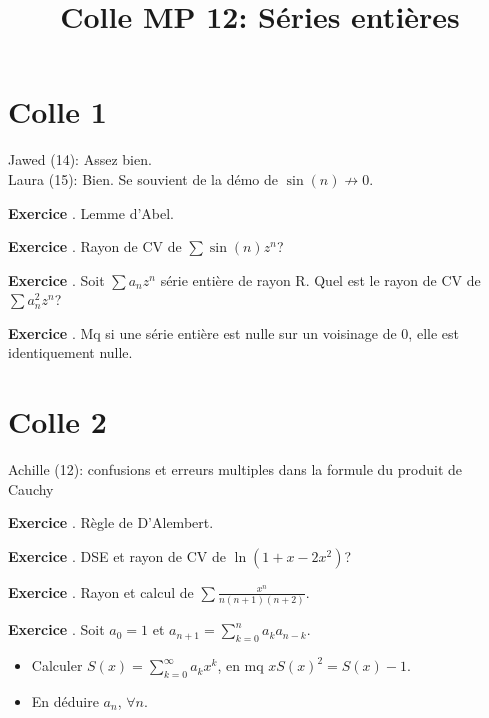\documentclass[10pt,a4paper]{article}
\title{Colle MP 12: Séries entières}
\newcounter{question}
\newcounter{exo}
\newenvironment{exo}{\vspace{0.5cm}\setcounter{question}{0}\addtocounter{exo}{1} \noindent \textbf{Exercice \theexo}. \normalsize }{\par}
\begin{document}
	\maketitle
	
	\section*{Colle 1}
	Jawed (14): Assez bien.\\
	Laura (15): Bien. Se souvient de la démo de $\sin(n) \not\longrightarrow 0$.\\
		
	\begin{exo}
		Lemme d'Abel.
	\end{exo}


	\begin{exo}
		Rayon de CV de $\sum \sin(n)z^n$?
	\end{exo}
	\begin{exo}
		Soit $\sum a_n z^n$ série entière de rayon R. Quel est le rayon de CV de $\sum a_n^2 z^n$?
	\end{exo}
			
	\begin{exo}
		Mq si une série entière est nulle sur un voisinage de 0, elle est identiquement nulle.
	\end{exo}
	\section*{Colle 2}
	\setcounter{exo}{0}
	Achille (12): confusions et erreurs multiples dans la formule du produit de Cauchy\\
	
	\begin{exo}
		Règle de D'Alembert.
	\end{exo}
	
	\begin{exo}
		DSE et rayon de CV de $\ln(1 + x - 2x^2)$?
	\end{exo}
	\begin{exo}
		Rayon et calcul de $\sum \frac{x^n}{n(n+1)(n+2)}$.
	\end{exo}

	\begin{exo}
		Soit $a_0 = 1$ et $a_{n+1} = \sum_{k=0}^{n} a_k a_{n-k}$.
		\begin{itemize}
			\item Calculer $S(x) = \sum_{k=0}^{\infty} a_k x^k$, en mq $xS(x)^2 = S(x) - 1$.
			\item En déduire $a_n$, $\forall n$.
		\end{itemize}
	\end{exo}
\end{document}
